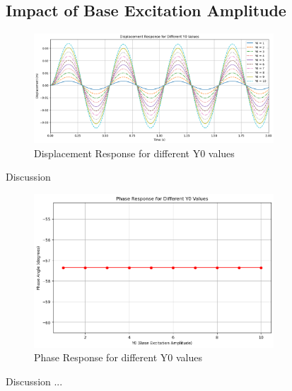 \documentclass[12pt,a4paper]{article}
\begin{document}
\subsection{Impact of Base Excitation Amplitude}
\begin{figure}[H]
    \centering
    \includegraphics[width=0.8\textwidth]{disp_response.png} 
    \caption{Displacement Response for different Y0 values}
    \label{fig:system}
\end{figure}
{\vspace{10pt}}
Discussion
{\vspace{10pt}}

\begin{figure}[H]
    \centering
    \includegraphics[width=0.8\textwidth]{phase_resp.png} 
    \caption{Phase Response for different Y0 values}
    \label{fig:system}
\end{figure}
{\vspace{10pt}}
Discussion ...
{\vspace{10pt}}

    
\end{document}
